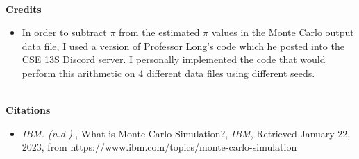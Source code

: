 \documentclass[12pt]{article}
\begin{document}
\large
\textbf{\\Credits}
\normalsize
\begin{itemize}
\item In order to subtract $\pi$ from the estimated $\pi$ values in the Monte Carlo output data file, I used a version of Professor Long's code which he posted into the CSE 13S Discord server. I personally implemented the code that would perform this arithmetic on 4 different data files using different seeds.
\end{itemize}

\large
\textbf{\\Citations}
\normalsize
\begin{itemize}
\item\textit{IBM. (n.d.).}, What is Monte Carlo Simulation?, \textit{IBM}, Retrieved January 22, 2023, from https://www.ibm.com/topics/monte-carlo-simulation
\end{itemize}
\end{document}
